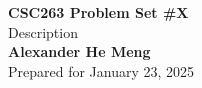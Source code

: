 \begin{titlepage}
    \null %
    \vfill
    \begin{center}
        {\fontsize{35}{48}\selectfont \bfseries CSC263 Problem Set \#X}
        \vspace{20pt} \\
        {\LARGE Description} \\
        \vspace{20pt}
        \textbf{Alexander He Meng}
        \vspace{8pt}
        \\ Prepared for January 23, 2025
    \end{center}
    \vfill
\end{titlepage}
